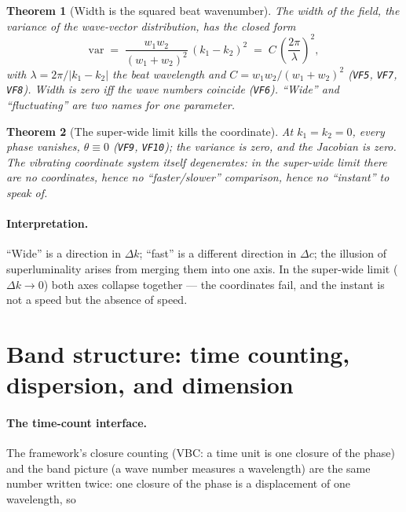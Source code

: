 \documentclass[aps,prd,preprint,superscriptaddress,amsmath,amssymb]{revtex4-2}
\newtheorem{theorem}{Theorem}[section]
\begin{document}
\begin{theorem}[Width is the squared beat wavenumber]\label{thm:vf8}
The width of the field, the variance of the wave-vector distribution,
has the closed form
\begin{equation}
\mathrm{var}
\;=\;\frac{w_1w_2}{(w_1+w_2)^2}\,(k_1-k_2)^2
\;=\;C\,\left(\frac{2\pi}{\lambda}\right)^2,
\label{eq:var}
\end{equation}
with $\lambda=2\pi/|k_1-k_2|$ the beat wavelength and
$C=w_1w_2/(w_1+w_2)^2$ (\texttt{VF5}, \texttt{VF7}, \texttt{VF8}).
Width is zero iff the wave numbers coincide (\texttt{VF6}).
\emph{``Wide'' and ``fluctuating'' are two names for one parameter.}
\end{theorem}

\begin{theorem}[The super-wide limit kills the coordinate]
\label{thm:vf10}
At $k_1=k_2=0$, every phase vanishes, $\theta\equiv0$
(\texttt{VF9}, \texttt{VF10}); the variance is zero, and the Jacobian
is zero.  The vibrating coordinate system itself degenerates: in the
super-wide limit there are no coordinates, hence no ``faster/slower''
comparison, hence no ``instant'' to speak of.
\end{theorem}

\paragraph{Interpretation.}
``Wide'' is a direction in $\Delta k$; ``fast'' is a different
direction in $\Delta c$; the illusion of superluminality arises from
merging them into one axis.  In the super-wide limit ($\Delta k\to0$)
both axes collapse together --- the coordinates fail, and the instant
is not a speed but the absence of speed.

\section{Band structure: time counting, dispersion, and dimension}
\label{sec:bands}

\paragraph{The time-count interface.}
The framework's closure counting (VBC: a time unit is one closure of
the phase) and the band picture (a wave number measures a wavelength)
are the same number written twice: one closure of the phase is a
displacement of one wavelength, so
\end{document}
